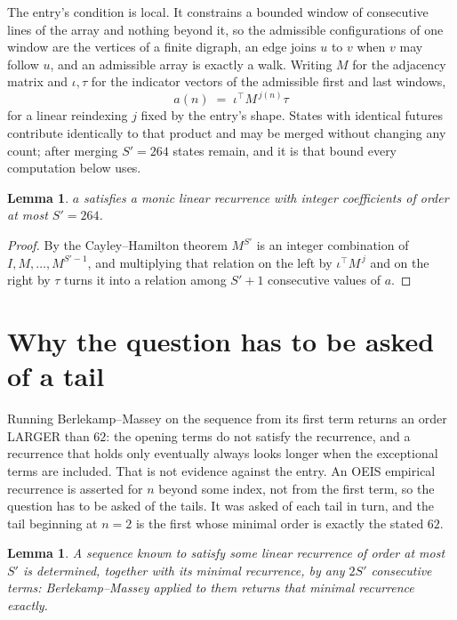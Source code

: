 \documentclass[11pt,a4paper]{article}
\theoremstyle{plain}
\newtheorem{lemma}[theorem]{Lemma}
\theoremstyle{definition}
\begin{document}
The entry's condition is local. It constrains a bounded window of consecutive lines of the
array and nothing beyond it, so the admissible configurations of one window are the vertices of
a finite digraph, an edge joins $u$ to $v$ when $v$ may follow $u$, and an admissible array is
exactly a walk. Writing $M$ for the adjacency matrix and $\iota,\tau$ for the indicator vectors
of the admissible first and last windows,
\[
a(n)\;=\;\iota^{\!\top}M^{\,j(n)}\tau
\]
for a linear reindexing $j$ fixed by the entry's shape. States with identical futures
contribute identically to that product and may be merged without changing any count; after
merging $S'=264$ states remain, and it is that bound every computation below uses.

\begin{lemma}\label{lem:cf}
$a$ satisfies a monic linear recurrence with integer coefficients of order at most $S'=264$.
\end{lemma}

\begin{proof}
By the Cayley--Hamilton theorem $M^{S'}$ is an integer combination of $I,M,\dots,M^{S'-1}$,
and multiplying that relation on the left by $\iota^{\!\top}M^{\,j}$ and on the right by
$\tau$ turns it into a relation among $S'+1$ consecutive values of $a$.
\end{proof}

\section{Why the question has to be asked of a tail}

Running Berlekamp--Massey on the sequence from its first term returns an order LARGER than $62$: the opening terms do not satisfy the recurrence, and a recurrence that holds only eventually always looks longer when the exceptional terms are included. That is not evidence against the entry. An OEIS empirical recurrence is asserted for $n$ beyond some index, not from the first term, so the question has to be asked of the tails. It was asked of each tail in turn, and the tail beginning at $n=2$ is the first whose minimal order is exactly the stated $62$.

\begin{lemma}\label{lem:bm}
A sequence known to satisfy some linear recurrence of order at most $S'$ is determined,
together with its minimal recurrence, by any $2S'$ consecutive terms: Berlekamp--Massey applied
to them returns that minimal recurrence exactly.
\end{lemma}
\end{document}
